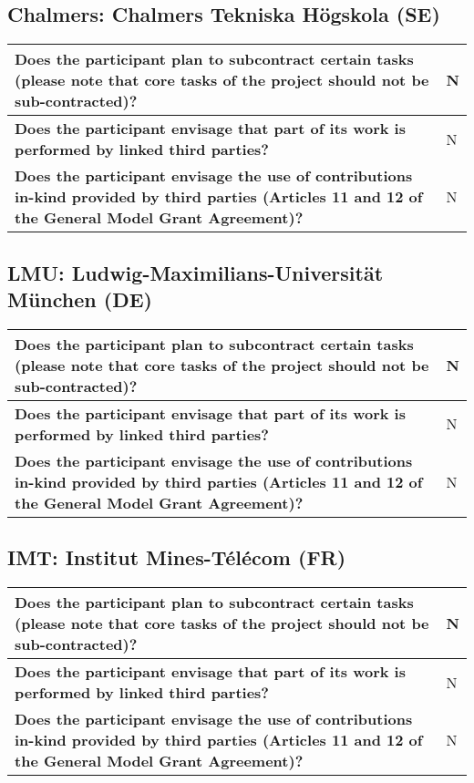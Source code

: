 \subsection*{Chalmers: Chalmers Tekniska Högskola (SE)}

\begin{longtable*}{|p{0.75\textwidth}|p{0.2\textwidth}|}
\hline
{\bf Does the participant plan to subcontract certain tasks (please
  note that core tasks of the project should not be sub-contracted)?}
&
N
\\
\hline
{\bf Does the participant envisage that  part of its work is performed
  by linked third parties?}
&
N
\\
\hline
{\bf Does the participant envisage the use of contributions in-kind
provided by third parties (Articles 11 and 12 of the General Model
Grant Agreement)?}
&
N
\\
\hline
\end{longtable*}

\subsection*{LMU: Ludwig-Maximilians-Universität München (DE)}

\begin{longtable*}{|p{0.75\textwidth}|p{0.2\textwidth}|}
\hline
{\bf Does the participant plan to subcontract certain tasks (please
  note that core tasks of the project should not be sub-contracted)?}
&
N
\\
\hline
{\bf Does the participant envisage that  part of its work is performed
  by linked third parties?}
&
N
\\
\hline
{\bf Does the participant envisage the use of contributions in-kind
provided by third parties (Articles 11 and 12 of the General Model
Grant Agreement)?}
&
N
\\
\hline
\end{longtable*}

\subsection*{IMT: Institut Mines-Télécom (FR)}

\begin{longtable*}{|p{0.75\textwidth}|p{0.2\textwidth}|}
\hline
{\bf Does the participant plan to subcontract certain tasks (please
  note that core tasks of the project should not be sub-contracted)?}
&
N
\\
\hline
{\bf Does the participant envisage that  part of its work is performed
  by linked third parties?}
&
N
\\
\hline
{\bf Does the participant envisage the use of contributions in-kind
provided by third parties (Articles 11 and 12 of the General Model
Grant Agreement)?}
&
N
\\
\hline
\end{longtable*}

